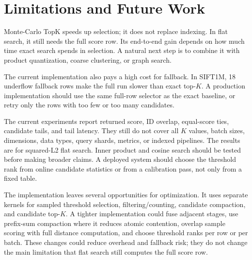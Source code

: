 \section{Limitations and Future Work}

Monte-Carlo TopK speeds up selection; it does not replace indexing. In flat
search, it still needs the full score row. Its end-to-end gain depends on how
much time exact search spends in selection. A natural next step is to combine it
with product quantization, coarse clustering, or graph search.

The current implementation also pays a high cost for fallback. In SIFT1M, 18
underflow fallback rows make the full run slower than exact top-$K$. A
production implementation should use the same full-row selector as the exact
baseline, or retry only the rows with too few or too many candidates.

The current experiments report returned score, ID overlap, equal-score ties,
candidate tails, and tail latency. They still do not cover all $K$ values, batch
sizes, dimensions, data types, query shards, metrics, or indexed pipelines. The
results are for squared-L2 flat search. Inner product and cosine search should
be tested before making broader claims. A deployed system should choose the
threshold rank from online candidate statistics or from a calibration pass, not
only from a fixed table.

The implementation leaves several opportunities for optimization. It uses
separate kernels for sampled threshold selection, filtering/counting,
candidate compaction, and candidate top-$K$. A tighter implementation could fuse
adjacent stages, use prefix-sum compaction where it reduces atomic contention,
overlap sample scoring with full distance computation, and choose threshold
ranks per row or per batch. These changes could reduce overhead and fallback risk;
they do not change the main limitation that flat search still computes the full
score row.
